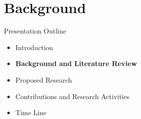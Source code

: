 \documentclass{beamer}
\begin{document}
\section{Background}
\begin{frame}{Presentation Outline}
    \begin{itemize}
     	\itemsep=.5cm
    	\item Introduction
    	\item {\bf Background and Literature Review}
    	\item Proposed Research
        \item Contributions and Research Activities
    	\item Time Line
    \end{itemize}
\end{frame}

\end{document}
